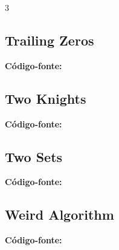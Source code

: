 \documentclass[8pt]{extarticle}
\begin{document}
\begin{multicols*}{3}
\subsection{Trailing Zeros}
\begin{caixaenunciado}

\end{caixaenunciado}
\vspace{0.3cm}
\noindent\textbf{Código-fonte:}


\subsection{Two Knights}
\begin{caixaenunciado}

\end{caixaenunciado}
\vspace{0.3cm}
\noindent\textbf{Código-fonte:}


\subsection{Two Sets}
\begin{caixaenunciado}

\end{caixaenunciado}
\vspace{0.3cm}
\noindent\textbf{Código-fonte:}


\subsection{Weird Algorithm}
\begin{caixaenunciado}

\end{caixaenunciado}
\vspace{0.3cm}
\noindent\textbf{Código-fonte:}

\end{multicols*}
\pagebreak
\end{document}
